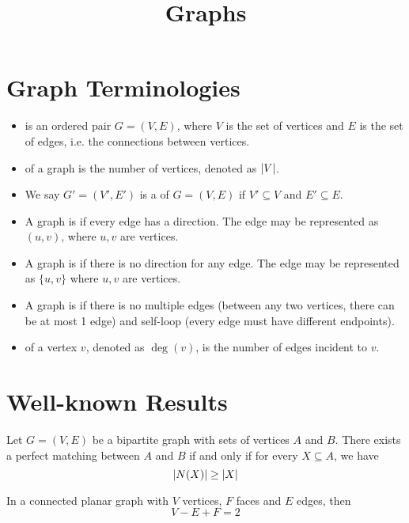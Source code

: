 \documentclass[11pt]{scrartcl}
\begin{document}
\title{Graphs}
\maketitle

\section{Graph Terminologies}

\begin{itemize}
    \item {} is an ordered pair $G = (V,E)$, where $V$ is the set of vertices and $E$ is the set of edges, i.e. the connections between vertices.
    \item {} of a graph is the number of vertices, denoted as $\left\lvert V \right\rvert$.
    \item We say $G' = (V',E')$ is a  of $G = (V,E)$ if $V' \subseteq V$ and $E' \subseteq E$.
    \item A graph is  if every edge has a direction. The edge may be represented as $(u,v)$, where $u,v$ are vertices.
    \item A graph is  if there is no direction for any edge. The edge may be represented as $\{u,v\}$ where $u,v$ are vertices.
    \item A graph is  if there is no multiple edges (between any two vertices, there can be at most 1 edge) and self-loop (every edge must have different endpoints).
    \item {} of a vertex $v$, denoted as $\deg(v)$, is the number of edges incident to $v$.
\end{itemize}



\section{Well-known Results}

\begin{theorem}
Let $G = (V,E)$ be a bipartite graph with sets of vertices $A$ and $B$. There exists a perfect matching between $A$ and $B$ if and only if for every $X \subseteq A$, we have
\[\left\lvert N(X) \right\rvert \ge \left\lvert X \right\rvert\]
\end{theorem}

\begin{theorem}
In a connected planar graph with $V$ vertices, $F$ faces and $E$ edges, then
\[V-E+F=2\]
\end{theorem}
\end{document}
